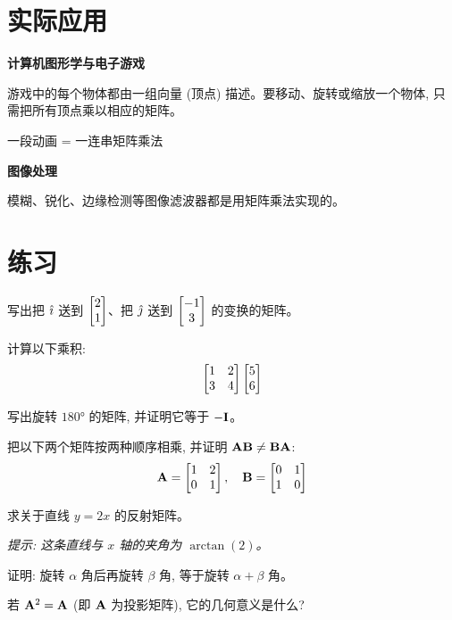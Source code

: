 \section{实际应用}

\begin{practical}
\textbf{计算机图形学与电子游戏}

游戏中的每个物体都由一组向量 (顶点) 描述。要移动、旋转或缩放一个物体, 只需把所有顶点乘以相应的矩阵。

一段动画 = 一连串矩阵乘法
\end{practical}

\begin{practical}
\textbf{图像处理}

模糊、锐化、边缘检测等图像滤波器都是用矩阵乘法实现的。
\end{practical}

\section{练习}

\begin{exercise}
写出把 $\hat{\imath}$ 送到 $\begin{bmatrix} 2 \\ 1 \end{bmatrix}$、把 $\hat{\jmath}$ 送到 $\begin{bmatrix} -1 \\ 3 \end{bmatrix}$ 的变换的矩阵。
\end{exercise}

\begin{exercise}
计算以下乘积:
\[
\begin{bmatrix} 1 & 2 \\ 3 & 4 \end{bmatrix} \begin{bmatrix} 5 \\ 6 \end{bmatrix}
\]
\end{exercise}

\begin{exercise}
写出旋转 $180°$ 的矩阵, 并证明它等于 $-\mathbf{I}$。
\end{exercise}

\begin{exercise}
把以下两个矩阵按两种顺序相乘, 并证明 $\mathbf{A}\mathbf{B} \neq \mathbf{B}\mathbf{A}$:
\[
\mathbf{A} = \begin{bmatrix} 1 & 2 \\ 0 & 1 \end{bmatrix}, \quad \mathbf{B} = \begin{bmatrix} 0 & 1 \\ 1 & 0 \end{bmatrix}
\]
\end{exercise}

\begin{exercise}[挑战]
求关于直线 $y = 2x$ 的反射矩阵。

\textit{提示: 这条直线与 $x$ 轴的夹角为 $\arctan(2)$。}
\end{exercise}

\begin{problem}
证明: 旋转 $\alpha$ 角后再旋转 $\beta$ 角, 等于旋转 $\alpha + \beta$ 角。
\end{problem}

\begin{problem}
若 $\mathbf{A}^2 = \mathbf{A}$ (即 $\mathbf{A}$ 为投影矩阵), 它的几何意义是什么?
\end{problem}
